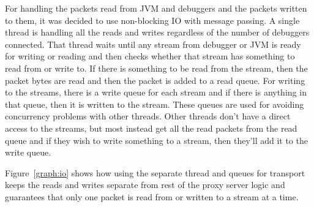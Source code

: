 \documentclass[..thesis.tex]{subfiles}
\begin{document}
For handling the packets read from JVM and debuggers and the packets written to them, it was decided to use non-blocking IO with message passing.
A single thread is handling all the reads and writes regardless of the number of debuggers connected.
That thread waits until any stream from debugger or JVM is ready for writing or reading and then checks whether that stream has something to read from or write to.
If there is something to be read from the stream, then the packet bytes are read and then the packet is added to a read queue.
For writing to the streams, there is a write queue for each stream and if there is anything in that queue, then it is written to the stream.
These queues are used for avoiding concurrency problems with other threads.
Other threads don't have a direct access to the streams, but most instead get all the read packets from the read queue and if they wish to write something to a stream, then they'll add it to the write queue.



Figure~\ref{graph:io} shows how using the separate thread and queues for transport keeps the reads and writes separate from rest of the proxy server logic and guarantees that only one packet is read from or written to a stream at a time.
\end{document}
